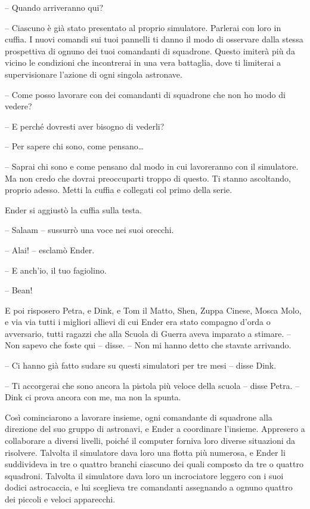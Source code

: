 {-- Quando arriveranno qui?}

{-- Ciascuno è già stato presentato al proprio simulatore. Parlerai con
	loro in cuffia. I nuovi comandi sui tuoi pannelli ti danno il modo di
	osservare dalla stessa prospettiva di ognuno dei tuoi comandanti di
	squadrone. Questo imiterà più da vicino le condizioni che incontrerai in
	una vera battaglia, dove ti limiterai a supervisionare l'azione di ogni
	singola astronave.}

{-- Come posso lavorare con dei comandanti di squadrone che non ho modo
	di vedere?}

{-- E perché dovresti aver bisogno di vederli?}

{-- Per sapere chi sono, come pensano\ldots{}}

{-- Saprai chi sono e come pensano dal modo in cui lavoreranno con il
	simulatore. Ma non credo che dovrai preoccuparti troppo di questo. Ti
	stanno ascoltando, proprio adesso. Metti la cuffia e collegati col primo
	della serie.}

{Ender si aggiustò la cuffia sulla testa.}

{-- Salaam -- sussurrò una voce nei suoi orecchi.}

{-- Alai! -- esclamò Ender.}

{-- E anch'io, il tuo fagiolino.}

{-- Bean!}

{E poi risposero Petra, e Dink, e Tom il Matto, Shen, Zuppa Cinese,
	Mosca Molo, e via via tutti i migliori allievi di cui Ender era stato
	compagno d'orda o avversario, tutti ragazzi che alla Scuola di Guerra
	aveva imparato a stimare. -- Non sapevo che foste qui -- disse. -- Non
	mi hanno detto che stavate arrivando.}

{-- Ci hanno già fatto sudare su questi simulatori per tre mesi -- disse
	Dink.}

{-- Ti accorgerai che sono ancora la pistola più veloce della scuola --
	disse Petra. -- Dink ci prova ancora con me, ma non la spunta.}

{Così cominciarono a lavorare insieme, ogni comandante di squadrone alla
	direzione del suo gruppo di astronavi, e Ender a coordinare l'insieme.
	Appresero a collaborare a diversi livelli, poiché il computer forniva
	loro diverse situazioni da risolvere. Talvolta il simulatore dava loro
	una flotta più numerosa, e Ender li suddivideva in tre o quattro branchi
	ciascuno dei quali composto da tre o quattro squadroni. Talvolta il
	simulatore dava loro un incrociatore leggero con i suoi dodici
	astrocaccia, e lui sceglieva tre comandanti assegnando a ognuno quattro
	dei piccoli e veloci apparecchi.}

